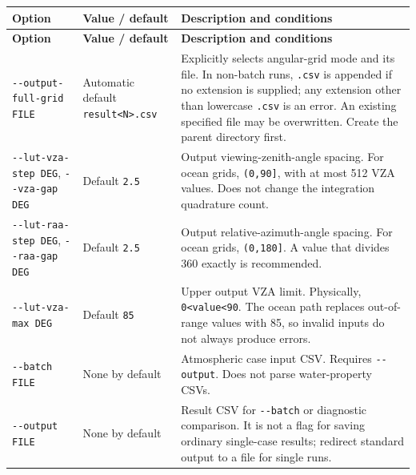{\TableFont
\begin{longtable}{@{}>{\raggedright\arraybackslash}p{}>{\raggedright\arraybackslash}p{}>{\raggedright\arraybackslash}p{}@{}}
\toprule
\textbf{Option} & \textbf{Value / default} & \textbf{Description and conditions} \\
\midrule
\endfirsthead
\toprule
\textbf{Option} & \textbf{Value / default} & \textbf{Description and conditions} \\
\midrule
\endhead
\bottomrule
\endfoot
\texttt{-\allowbreak{}-\allowbreak{}output-\allowbreak{}full-\allowbreak{}grid FILE} & Automatic default \texttt{result<N>.\allowbreak{}csv} & Explicitly selects angular-grid mode and its file. In non-batch runs, \texttt{.\allowbreak{}csv} is appended if no extension is supplied; any extension other than lowercase \texttt{.\allowbreak{}csv} is an error. An existing specified file may be overwritten. Create the parent directory first. \\
\texttt{-\allowbreak{}-\allowbreak{}lut-\allowbreak{}vza-\allowbreak{}step DEG}, \texttt{-\allowbreak{}-\allowbreak{}vza-\allowbreak{}gap DEG} & Default \texttt{2.\allowbreak{}5\textdegree{}} & Output viewing-zenith-angle spacing. For ocean grids, \texttt{(0,\allowbreak{}90]}, with at most 512 VZA values. Does not change the integration quadrature count. \\
\texttt{-\allowbreak{}-\allowbreak{}lut-\allowbreak{}raa-\allowbreak{}step DEG}, \texttt{-\allowbreak{}-\allowbreak{}raa-\allowbreak{}gap DEG} & Default \texttt{2.\allowbreak{}5\textdegree{}} & Output relative-azimuth-angle spacing. For ocean grids, \texttt{(0,\allowbreak{}180]}. A value that divides 360 exactly is recommended. \\
\texttt{-\allowbreak{}-\allowbreak{}lut-\allowbreak{}vza-\allowbreak{}max DEG} & Default \texttt{85\textdegree{}} & Upper output VZA limit. Physically, \texttt{0<value<90}. The ocean path replaces out-of-range values with 85, so invalid inputs do not always produce errors. \\
\texttt{-\allowbreak{}-\allowbreak{}batch FILE} & None by default & Atmospheric case input CSV. Requires \texttt{-\allowbreak{}-\allowbreak{}output}. Does not parse water-property CSVs. \\
\texttt{-\allowbreak{}-\allowbreak{}output FILE} & None by default & Result CSV for \texttt{-\allowbreak{}-\allowbreak{}batch} or diagnostic comparison. It is not a flag for saving ordinary single-case results; redirect standard output to a file for single runs. \\

\end{longtable}}
